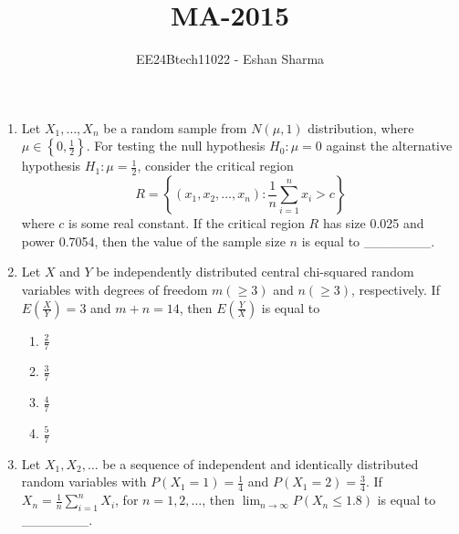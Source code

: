\documentclass[journal,12pt,onecolumn]{IEEEtran}
\theoremstyle{remark}
\begin{document}

\vspace{3cm}

\title{MA-2015}
\author{EE24Btech11022 - Eshan Sharma}
\maketitle

\renewcommand{\thefigure}{\theenumi}
\renewcommand{\thetable}{\theenumi}



\begin{enumerate}
\item Let $X_1, \ldots, X_n$ be a random sample from $N(\mu, 1)$ distribution, where $\mu \in \left\{ 0, \frac{1}{2} \right\}$. For testing the null hypothesis $H_0: \mu = 0$ against the alternative hypothesis $H_1: \mu = \frac{1}{2}$, consider the critical region 
$$ R = \left\{ (x_1, x_2, \ldots, x_n) : \frac{1}{n} \sum_{i=1}^n x_i > c \right\} $$
where $c$ is some real constant. If the critical region $R$ has size 0.025 and power 0.7054, then the value of the sample size $n$ is equal to \_\_\_\_\_\_\_.\\

\item Let $X$ and $Y$ be independently distributed central chi-squared random variables with degrees of freedom $m (\ge 3)$ and $n (\ge 3)$, respectively. If $E \left( \frac{X}{Y} \right) = 3$ and $m + n = 14$, then $E \left( \frac{Y}{X} \right)$ is equal to
\begin{multicols}{4}
	\begin{enumerate}
		\item $\frac{2}{7}$
		\item $\frac{3}{7}$
		\item $\frac{4}{7}$
		\item $\frac{5}{7}$
	\end{enumerate}
\end{multicols}

\item Let $X_1, X_2, \ldots$ be a sequence of independent and identically distributed random variables with $P(X_1 = 1) = \frac{1}{4}$ and $P(X_1 = 2) = \frac{3}{4}$. If $X_n = \frac{1}{n} \sum_{i=1}^n X_i$, for $n = 1, 2, \ldots$, then $\lim_{n \to \infty} P(X_n \le 1.8)$ is equal to \_\_\_\_\_\_\_.


\end{enumerate}
\end{document}
